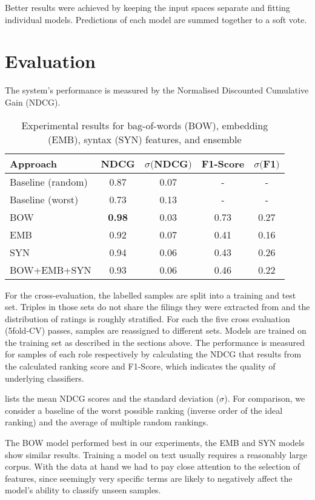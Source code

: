 Better results were achieved by keeping the input spaces separate and fitting individual models.
Predictions of each model are summed together to a soft vote.

\section{Evaluation}



The system's performance is measured by the Normalised Discounted Cumulative Gain (NDCG)\cite{ir}.
\begin{table}[H]
	\caption{Experimental results for bag-of-words (BOW), embedding (EMB), syntax (SYN) features, and ensemble}
	\label{tab:results}
	\begin{tabular}{lcccc}
		\toprule
		Approach & NDCG & $\sigma ($NDCG$)$ & F1-Score &  $\sigma ($F1$)$\\
		\midrule
		Baseline (random) & 0.87 & 0.07 & - & - \\
		Baseline (worst)  & 0.73 & 0.13 & - & - \\
		\midrule
		BOW & \textbf{0.98} & 0.03 & 0.73 & 0.27\\
		EMB & 0.92 & 0.07 & 0.41 & 0.16\\
		SYN & 0.94 & 0.06 & 0.43 & 0.26 \\
		BOW+EMB+SYN& 0.93 & 0.06 & 0.46 & 0.22\\
		\bottomrule
	\end{tabular}
\end{table}
For the cross-evaluation, the labelled samples are split into a training and test set.
Triples in those sets do not share the filings they were extracted from and the distribution of ratings is roughly stratified.
For each the five cross evaluation (5fold-CV) passes, samples are reassigned to different sets.
Models are trained on the training set as described in the sections above.
The performance is measured for samples of each role respectively by calculating the NDCG that results from the calculated ranking score and F1-Score, which indicates the quality of underlying classifiers.

 lists the mean NDCG scores and the standard deviation ($\sigma$).
For comparison, we consider a baseline of the worst possible ranking (inverse order of the ideal ranking) and the average of multiple random rankings.

The BOW model performed best in our experiments, the EMB and SYN models show similar results. 
Training a model on text usually requires a reasonably large corpus.
With the data at hand we had to pay close attention to the selection of features, since seemingly very specific terms are likely to negatively affect the model's ability to classify unseen samples.

